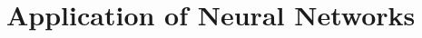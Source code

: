 \documentclass[12pt, letterpaper]{article}
\theoremstyle{definition}
\newcommand{\x}{\mathbf{x}}
\let\ti\textit
\let\tb\textbf
\begin{document}
\section{Application of Neural Networks}


\end{document}
